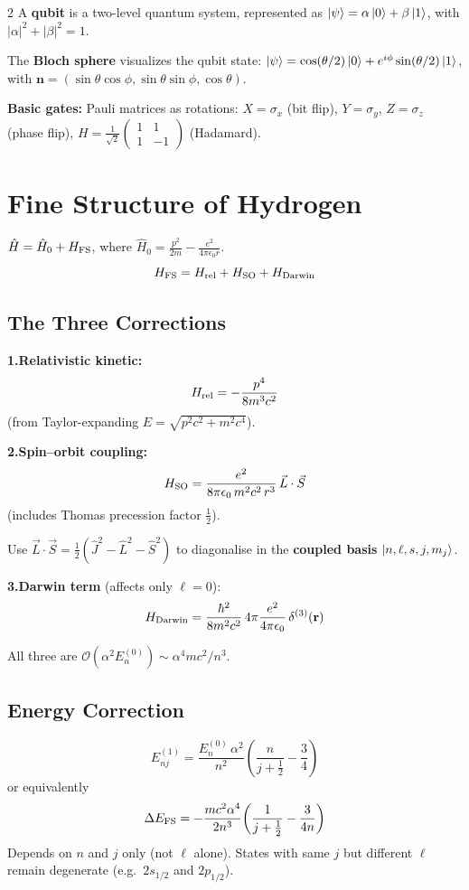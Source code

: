 \documentclass[9pt,a4paper]{article} %
\newcommand{\Hhat}{\hat{H}}
\begin{document}
\begin{multicols}{2}
A \textbf{qubit} is a two-level quantum system, represented as $\ket{\psi} = \alpha\ket{0} + \beta\ket{1}$, with $|\alpha|^2 + |\beta|^2 = 1$.

The \textbf{Bloch sphere} visualizes the qubit state: $\ket{\psi} = \cos(\theta/2)\ket{0} + e^{i\phi}\sin(\theta/2)\ket{1}$, with $\mathbf{n} = (\sin\theta\cos\phi, \sin\theta\sin\phi, \cos\theta)$.

\textbf{Basic gates:} Pauli matrices as rotations: $X = \sigma_x$ (bit flip), $Y = \sigma_y$, $Z = \sigma_z$ (phase flip), $H = \frac{1}{\sqrt{2}}\begin{pmatrix}1&1\\1&-1\end{pmatrix}$ (Hadamard).

\section{Fine Structure of Hydrogen}

$\Hhat=\Hhat_0+H_{\rm FS}$, where $\Hhat_0=\frac{p^2}{2m}-\frac{e^2}{4\pi\epsilon_0 r}$.
\[
H_{\rm FS}=H_{\rm rel}+H_{\rm SO}+H_{\rm Darwin}
\]

\subsection{The Three Corrections}
\textbf{1.\;Relativistic kinetic:}
\[
H_{\rm rel}=-\frac{p^4}{8m^3c^2}
\]
(from Taylor-expanding $E=\sqrt{p^2c^2+m^2c^4}$).

\textbf{2.\;Spin--orbit coupling:}
\[
H_{\rm SO}=\frac{e^2}{8\pi\epsilon_0\,m^2c^2\,r^3}\,\vec{L}\cdot\vec{S}
\]
(includes Thomas precession factor $\frac{1}{2}$).

Use $\vec{L}\cdot\vec{S}=\tfrac{1}{2}(\hat{J}^2-\hat{L}^2-\hat{S}^2)$ to diagonalise in the \textbf{coupled basis} $\ket{n,\ell,s,j,m_j}$.

\textbf{3.\;Darwin term} (affects only $\ell=0$):
\[
H_{\rm Darwin}=\frac{\hbar^2}{8m^2c^2}\,4\pi\frac{e^2}{4\pi\epsilon_0}\,\delta^{(3)}(\mathbf{r})
\]

All three are $\mathcal{O}(\alpha^2 E_n^{(0)})\sim\alpha^4 mc^2/n^3$.

\subsection{Energy Correction}
\[
\boxed{E_{nj}^{(1)}=\frac{E_n^{(0)}\,\alpha^2}{n^2}\!\left(\frac{n}{j+\frac{1}{2}}-\frac{3}{4}\right)}
\]
or equivalently
\[
\Delta E_{\rm FS}=-\frac{mc^2\alpha^4}{2n^3}\!\left(\frac{1}{j+\frac{1}{2}}-\frac{3}{4n}\right)
\]
Depends on $n$ and $j$ only (not $\ell$ alone).  States with same $j$ but different $\ell$ remain degenerate (e.g.\ $2s_{1/2}$ and $2p_{1/2}$).


\end{multicols}
\end{document}
